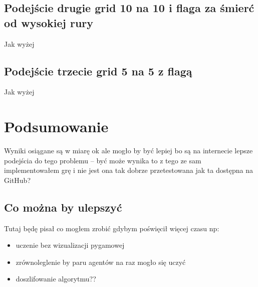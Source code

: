 \documentclass[a4paper, 12pt,oneside]{book}
\begin{document}
\section{Podejście drugie grid 10 na 10 i flaga za śmierć od wysokiej rury}
Jak wyżej
\section{Podejście trzecie grid 5 na 5 z flagą}
Jak wyżej

\chapter{Podsumowanie}
Wyniki osiągane są w miarę ok ale mogło by być lepiej bo są na internecie lepsze
podejścia do tego problemu -- być może wynika to z tego ze sam implementowałem grę
i nie jest ona tak dobrze przetestowana jak ta dostępna na GitHub?
\section{Co można by ulepszyć}
Tutaj będę pisał co mogłem zrobić gdybym poświęcił więcej czasu np:
\begin{itemize}
\item uczenie bez wizualizacji pygamowej
\item zrównoleglenie by paru agentów na raz mogło się uczyć
\item doszlifowanie algorytmu??
\end{itemize}




\end{document}
